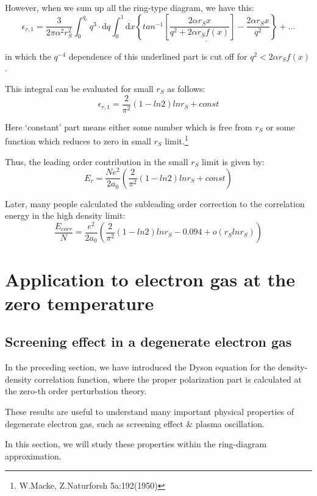 However, when we sum up all the ring-type diagram, we have this:
\[ \epsilon_{r,1} = \frac{3}{2\pi \alpha^2 r_S^2}\int_0^{q_c} q^3 \cdot \mathrm{d} q \int_0^1 \mathrm{d} x \underline{\left\{ tan^{-1}\left[ \frac{2\alpha r_S x}{q^2 + 2\alpha r_S f(x)} \right] -\frac{2\alpha r_S x}{q^2} \right\}} + \ldots \]

in which the $q^{-4}$ dependence of this underlined part is cut off for $q^2 < 2 \alpha r_S f(x)$.

This integral can be evaluated for small $r_S$ as follows:
\begin{equation} \label{Eqs2.8.42}
\epsilon_{r,1} = \frac{2}{\pi^2}(1-ln 2)ln r_S + const
\end{equation}

Here `constant' part means either some number which is free from $r_S$ or some function which reduces to zero in small $r_S$ limit.\footnote{W.Macke, Z.Naturforsh 5a:192(1950)}

Thus, the leading order contribution in the small $r_S$ limit is given by:
\[E_r = \frac{N e^2}{2 a_0} \left( \frac{2}{\pi^2} (1-ln 2) ln r_S + const \right)\]

Later, many people calculated the subleading order correction to the correlation energy in the high density limit:
\begin{equation} \label{Eqs2.8.43}
\frac{E_{corr}}{N} = \frac{e^2}{2 a_0} \left( \frac{2}{\pi^2}(1 -ln 2) ln r_S - 0.094 + o(r_S ln r_S) \right)
\end{equation}

\chapter{Application to electron gas at the zero temperature}%

\section{Screening effect in a degenerate electron gas}

In the preceding section, we have introduced the Dyson equation for the density-density correlation function, where the proper polarization part is calculated at the zero-th order perturbation theory.

These results are useful to understand many important physical properties of degenerate electron gas, such as screening effect \& plasma oscillation.

In this section, we will study these properties within the ring-diagram approximation.

